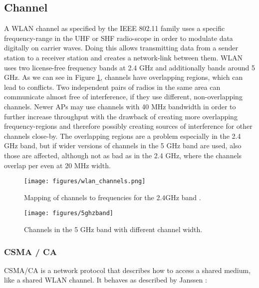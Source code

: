   \subsection{Channel}
    A \ac{WLAN} channel as specified by the IEEE 802.11 family uses a specific frequency-range in the \ac{UHF} or \ac{SHF} radio-scope in order 
    to modulate data digitally on carrier waves.
    Doing this allows transmitting data from a sender station to a receiver station and creates a network-link between them.
    \ac{WLAN} uses two license-free frequency bands at 2.4 GHz and additionally bands around 5 GHz.
    As we can see in Figure \ref{fig:wlan_channels}, channels have overlapping regions, which can lead to conflicts.
    Two independent pairs of radios in the same area can communicate almost free of interference, if they use different, non-overlapping channels.
    Newer APs may use channels with 40 MHz bandwidth in order to further increase throughput with the drawback of creating more overlapping frequency-regions
    and therefore possibly creating sources of interference for other channels close-by.
    The overlapping regions are a problem especially in the 2.4 GHz band, but if wider versions of channels in the 5 GHz band are used, also those are affected,
    although not as bad as in the 2.4 GHz, where the channels overlap per even at 20 MHz width.
    
    \begin{figure}[bh!]
      \centering
      \texttt{[image: figures/wlan\_channels.png]}
      \caption{Mapping of channels to frequencies for the 2.4GHz band \cite{wlan_channels}.}
      \label{fig:wlan_channels}
    \end{figure}
    
    \begin{figure}[bh!]
      \centering
      \texttt{[image: figures/5ghzband]}
      \caption{Channels in the 5 GHz band with different channel width.}
      \label{fig:5ghzband}
    \end{figure}
    
      \subsubsection{CSMA / CA}
	\ac{CSMA/CA} is a network protocol that describes how to access a shared medium, like a shared \ac{WLAN} channel.
	It behaves as described by Janssen \cite{csma_techo}:
	
